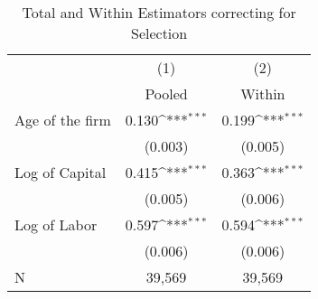 \begin{table}[htbp]\centering
\def\sym#1{\ifmmode^{#1}\else\(^{#1}\)\fi}
\caption{Total and Within Estimators correcting for Selection \label{tab:q4b2}}
\begin{tabular}{l*{2}{c}}
\toprule
                    &\multicolumn{1}{c}{(1)}&\multicolumn{1}{c}{(2)}\\
                    &\multicolumn{1}{c}{Pooled}&\multicolumn{1}{c}{Within}\\
\midrule
Age of the firm     &       0.130\sym{***}&       0.199\sym{***}\\
                    &     (0.003)         &     (0.005)         \\
\addlinespace
Log of Capital      &       0.415\sym{***}&       0.363\sym{***}\\
                    &     (0.005)         &     (0.006)         \\
\addlinespace
Log of Labor        &       0.597\sym{***}&       0.594\sym{***}\\
                    &     (0.006)         &     (0.006)         \\
\midrule
N                   &      39,569         &      39,569         \\
\bottomrule
\end{tabular}
\end{table}
